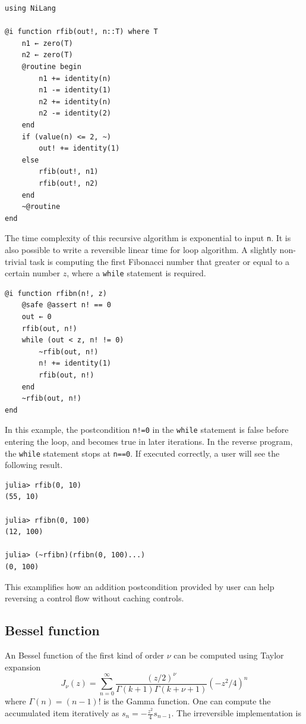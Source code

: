 \documentclass[aps,twocolumn,longbibliography,english,superscriptaddress]{revtex4-1}
\newcommand{\<}{\langle}
\renewcommand{\>}{\rangle}
\theoremstyle{definition}\newtheorem{definition}{\textit{Definition}}
\begin{document}
\begin{minipage}{.44\textwidth}
    \begin{lstlisting}
using NiLang

@i function rfib(out!, n::T) where T
    n1 ← zero(T)
    n2 ← zero(T)
    @routine begin
        n1 += identity(n)
        n1 -= identity(1)
        n2 += identity(n)
        n2 -= identity(2)
    end
    if (value(n) <= 2, ~)
        out! += identity(1)
    else
        rfib(out!, n1)
        rfib(out!, n2)
    end
    ~@routine
end
\end{lstlisting}
\end{minipage}

The time complexity of this recursive algorithm is exponential to input \texttt{n}. It is also possible to write a reversible linear time for loop algorithm.
A slightly non-trivial task is computing the first Fibonacci number that greater or equal to a certain number $z$, where a \texttt{while} statement is required.

\begin{minipage}{.44\textwidth}
\begin{lstlisting}
@i function rfibn(n!, z)
    @safe @assert n! == 0
    out ← 0
    rfib(out, n!)
    while (out < z, n! != 0)
        ~rfib(out, n!)
        n! += identity(1)
        rfib(out, n!)
    end
    ~rfib(out, n!)
end
\end{lstlisting}
\end{minipage}

In this example, the postcondition \texttt{n!=0} in the \texttt{while} statement is false before entering the loop, and becomes true in later iterations. In the reverse program, the \texttt{while} statement stops at \texttt{n==0}.
If executed correctly, a user will see the following result.

\begin{minipage}{.44\textwidth}
\begin{lstlisting}
julia> rfib(0, 10)
(55, 10)

julia> rfibn(0, 100)
(12, 100)

julia> (~rfibn)(rfibn(0, 100)...)
(0, 100)
\end{lstlisting}
\end{minipage}

This examplifies how an addition postcondition provided by user can help reversing a control flow without caching controls.

\subsection{Bessel function}\label{sec:bessel}
An Bessel function of the first kind of order $\nu$ can be computed using Taylor expansion
\begin{equation}
    J_\nu(z) = \sum\limits_{n=0}^{\infty} \frac{(z/2)^\nu}{\Gamma(k+1)\Gamma(k+\nu+1)} (-z^2/4)^{n}
\end{equation}
where $\Gamma(n) = (n-1)!$ is the Gamma function. One can compute the accumulated item iteratively as $s_n = -\frac{z^2}{4} s_{n-1}$. The irreversible implementation is
\end{document}
